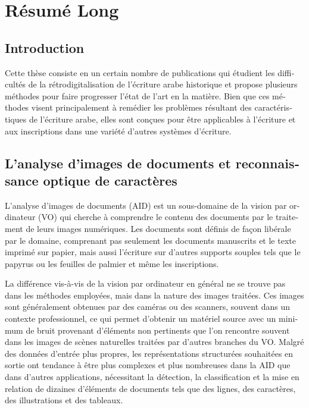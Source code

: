 \chapter{Résumé Long}

\begin{french}

\section{Introduction}

Cette thèse consiste en un certain nombre de publications qui étudient les
difficultés de la rétrodigitalisation de l'écriture arabe historique et propose
plusieurs méthodes pour faire progresser l'état de l'art en la matière. Bien
que ces méthodes visent principalement à remédier les problèmes résultant des
caractéristiques de l'écriture arabe, elles sont conçues pour être applicables
à l'écriture et aux inscriptions dans une variété d'autres systèmes d'écriture.

\section{L'analyse d'images de documents et reconnaissance optique de caractères}

L'analyse d'images de documents (AID) est un sous-domaine de la vision par
ordinateur (VO) qui cherche à comprendre le contenu des documents par
le traitement de leurs images numériques.  Les documents sont définis
de façon libérale par le domaine, comprenant pas seulement les
documents manuscrits et le texte imprimé sur papier, mais aussi
l'écriture sur d'autres supports souples tels que le papyrus ou les
feuilles de palmier et même les inscriptions.

La différence vis-à-vis de la vision par ordinateur en général ne se trouve pas
dans les méthodes employées, mais dans la nature des images traitées.
Ces images sont généralement obtenues par des caméras ou des scanners,
souvent dans un contexte professionnel, ce qui permet d'obtenir un
matériel source avec un minimum de bruit provenant d'éléments non
pertinents que l'on rencontre souvent dans les images de scènes
naturelles traitées par d'autres branches du VO. Malgré des données d'entrée
plus propres, les représentations structurées souhaitées en sortie ont
tendance à être plus complexes et plus nombreuses dans la AID que dans
d'autres applications, nécessitant la détection, la classification et
la mise en relation de dizaines d'éléments de documents tels que des
lignes, des caractères, des illustrations et des tableaux.


\end{french}
